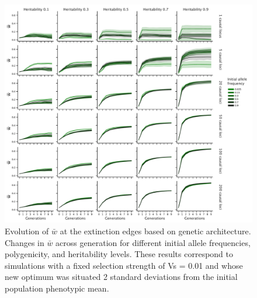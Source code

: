 \documentclass{article}
\begin{document}
\begin{figure}[H]
  \centering
  \includegraphics[width=1\textwidth]{figures/mean_fitness_acrossgen.pdf}
  \caption{Evolution of $\bar{w}$ at the extinction edges based on genetic architecture. Changes in $\bar{w}$ across generation for different initial allele frequencies, polygenicity, and heritability levels. These results correspond to simulations with a fixed selection strength of Vs = 0.01 and whose new optimum was situated 2 standard deviations from the initial population phenotypic mean.}
  \label{fig:mean_fitness_acrossgen}
\end{figure}
\end{document}
